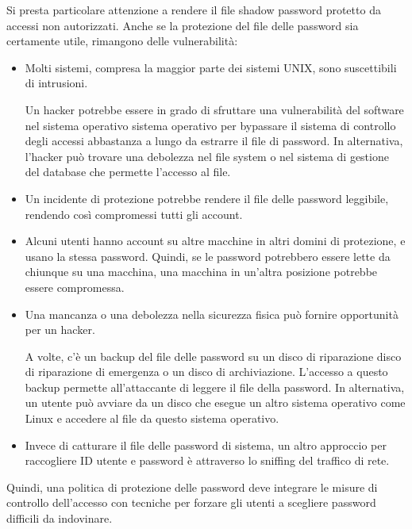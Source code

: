 Si presta particolare attenzione a rendere il file shadow password protetto da accessi non autorizzati. Anche se la protezione del file delle password sia certamente utile, rimangono delle vulnerabilità:

\begin{itemize}
    \item Molti sistemi, compresa la maggior parte dei sistemi UNIX, sono suscettibili di intrusioni.

Un hacker potrebbe essere in grado di sfruttare una vulnerabilità del software nel sistema operativo sistema operativo per bypassare il sistema di controllo degli accessi abbastanza a lungo da estrarre il file di password. In alternativa, l'hacker può trovare una debolezza nel file system o nel sistema di gestione del database che permette l'accesso al file.

    \item Un incidente di protezione potrebbe rendere il file delle password leggibile, rendendo così compromessi tutti gli account.

    \item Alcuni utenti hanno account su altre macchine in altri domini di protezione, e usano la stessa password. Quindi, se le password potrebbero essere lette da chiunque su una macchina, una macchina in un'altra posizione potrebbe essere compromessa.

    \item Una mancanza o una debolezza nella sicurezza fisica può fornire opportunità per un hacker.

A volte, c'è un backup del file delle password su un disco di riparazione disco di riparazione di emergenza o un disco di archiviazione. L'accesso a questo backup permette all'attaccante di leggere il file della password. In alternativa, un utente può avviare da un disco che esegue un altro sistema operativo come Linux e accedere al file da questo sistema operativo.


    \item Invece di catturare il file delle password di sistema, un altro approccio per raccogliere ID utente e password è attraverso lo sniffing del traffico di rete.
\end{itemize}
\singlespacing
Quindi, una politica di protezione delle password deve integrare le misure di controllo dell'accesso con tecniche per forzare gli utenti a scegliere password difficili da indovinare.
\newpage
